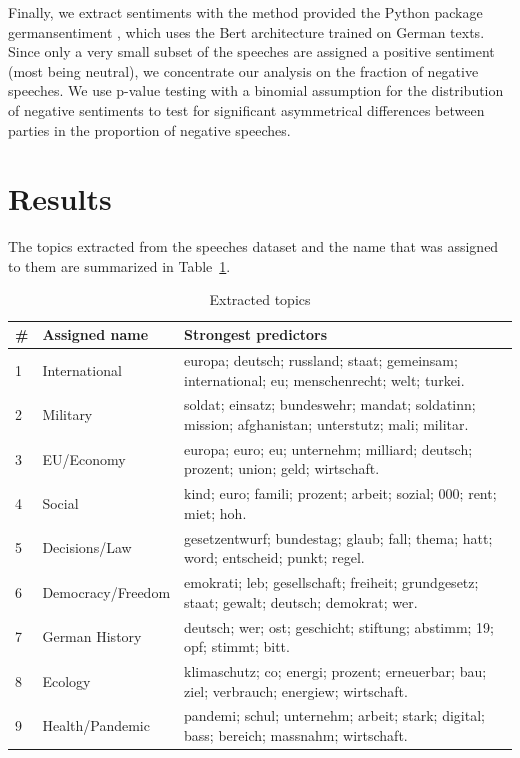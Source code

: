 \documentclass{article}
\begin{document}
Finally, we extract sentiments with the method provided the Python package germansentiment \cite{Germansentiment}, which uses the Bert architecture trained on German texts.
Since only a very small subset of the speeches are assigned a positive sentiment (most being neutral), we concentrate our analysis on the fraction of negative speeches.
We use p-value testing with a binomial assumption for the distribution of negative sentiments to test for significant asymmetrical differences between parties in the proportion of negative speeches.

\section{Results}
The topics extracted from the speeches dataset and the name that was assigned to them are summarized in Table~\ref{topics_table}.
\begin{table}
  \captionsetup{width=0.9\linewidth}
  \caption{Extracted topics}
  \label{topics_table}
  \centering
  \begin{tabular}{p{0.02\linewidth} | p{0.2\linewidth} | p{0.78\linewidth}}
    \toprule
    \# & Assigned name & Strongest predictors \\
    \midrule
    1 & International & europa; deutsch; russland; staat; gemeinsam; international; eu; menschenrecht; welt; turkei. \\
    2 & Military & soldat; einsatz; bundeswehr; mandat; soldatinn; mission; afghanistan; unterstutz; mali; militar. \\
    3 & EU/Economy & europa; euro; eu; unternehm; milliard; deutsch; prozent; union; geld; wirtschaft. \\
    4 & Social & kind; euro; famili; prozent; arbeit; sozial; 000; rent; miet; hoh. \\
    5 & Decisions/Law & gesetzentwurf; bundestag; glaub; fall; thema; hatt; word; entscheid; punkt; regel. \\
    6 & Democracy/Freedom & emokrati; leb; gesellschaft; freiheit; grundgesetz; staat; gewalt; deutsch; demokrat; wer. \\
    7 & German History & deutsch; wer; ost; geschicht; stiftung; abstimm; 19; opf; stimmt; bitt. \\
    8 & Ecology & klimaschutz; co; energi; prozent; erneuerbar; bau; ziel; verbrauch; energiew; wirtschaft. \\
    9 & Health/Pandemic & pandemi; schul; unternehm; arbeit; stark; digital; bass; bereich; massnahm; wirtschaft. \\
    \bottomrule
  \end{tabular}
\end{table}
\end{document}
